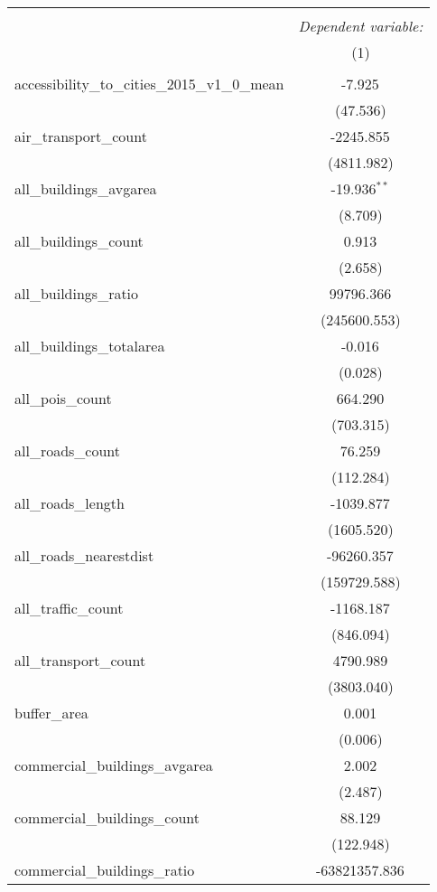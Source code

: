 \begin{table}[!htbp] \centering
\begin{tabular}{@{\extracolsep{5pt}}lc}
\\[-1.8ex]\hline
\hline \\[-1.8ex]
& \multicolumn{1}{c}{\textit{Dependent variable:}} \
\cr \cline{1-2}
\\[-1.8ex] & (1) \\
\hline \\[-1.8ex]
 accessibility_to_cities_2015_v1_0_mean & -7.925$^{}$ \\
  & (47.536) \\
 air_transport_count & -2245.855$^{}$ \\
  & (4811.982) \\
 all_buildings_avgarea & -19.936$^{**}$ \\
  & (8.709) \\
 all_buildings_count & 0.913$^{}$ \\
  & (2.658) \\
 all_buildings_ratio & 99796.366$^{}$ \\
  & (245600.553) \\
 all_buildings_totalarea & -0.016$^{}$ \\
  & (0.028) \\
 all_pois_count & 664.290$^{}$ \\
  & (703.315) \\
 all_roads_count & 76.259$^{}$ \\
  & (112.284) \\
 all_roads_length & -1039.877$^{}$ \\
  & (1605.520) \\
 all_roads_nearestdist & -96260.357$^{}$ \\
  & (159729.588) \\
 all_traffic_count & -1168.187$^{}$ \\
  & (846.094) \\
 all_transport_count & 4790.989$^{}$ \\
  & (3803.040) \\
 buffer_area & 0.001$^{}$ \\
  & (0.006) \\
 commercial_buildings_avgarea & 2.002$^{}$ \\
  & (2.487) \\
 commercial_buildings_count & 88.129$^{}$ \\
  & (122.948) \\
 commercial_buildings_ratio & -63821357.836$^{}$ \\

\end{tabular}
\end{table}
